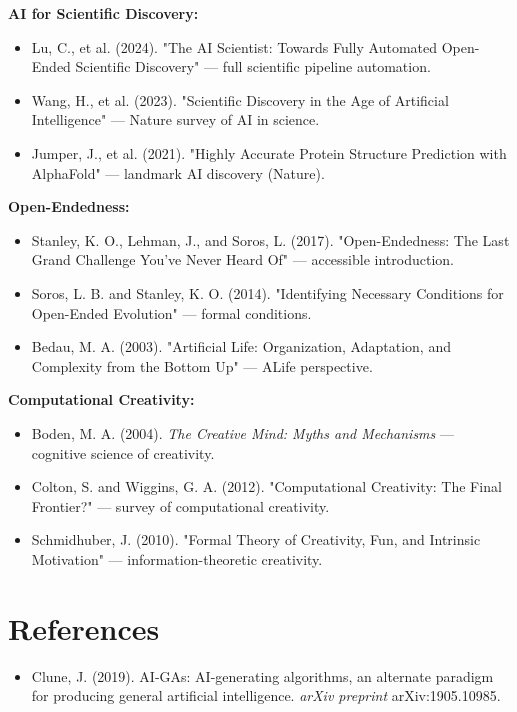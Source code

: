 \textbf{AI for Scientific Discovery:}
\begin{itemize}
\item Lu, C., et al. (2024). "The AI Scientist: Towards Fully Automated Open-Ended Scientific Discovery" --- full scientific pipeline automation.
\item Wang, H., et al. (2023). "Scientific Discovery in the Age of Artificial Intelligence" --- Nature survey of AI in science.
\item Jumper, J., et al. (2021). "Highly Accurate Protein Structure Prediction with AlphaFold" --- landmark AI discovery (Nature).
\end{itemize}

\textbf{Open-Endedness:}
\begin{itemize}
\item Stanley, K. O., Lehman, J., and Soros, L. (2017). "Open-Endedness: The Last Grand Challenge You've Never Heard Of" --- accessible introduction.
\item Soros, L. B. and Stanley, K. O. (2014). "Identifying Necessary Conditions for Open-Ended Evolution" --- formal conditions.
\item Bedau, M. A. (2003). "Artificial Life: Organization, Adaptation, and Complexity from the Bottom Up" --- ALife perspective.
\end{itemize}

\textbf{Computational Creativity:}
\begin{itemize}
\item Boden, M. A. (2004). \textit{The Creative Mind: Myths and Mechanisms} --- cognitive science of creativity.
\item Colton, S. and Wiggins, G. A. (2012). "Computational Creativity: The Final Frontier?" --- survey of computational creativity.
\item Schmidhuber, J. (2010). "Formal Theory of Creativity, Fun, and Intrinsic Motivation" --- information-theoretic creativity.
\end{itemize}



\section{References}

\begin{itemize}
\item Clune, J. (2019). AI-GAs: AI-generating algorithms, an alternate paradigm for producing general artificial intelligence. \textit{arXiv preprint} arXiv:1905.10985.
\end{itemize}


